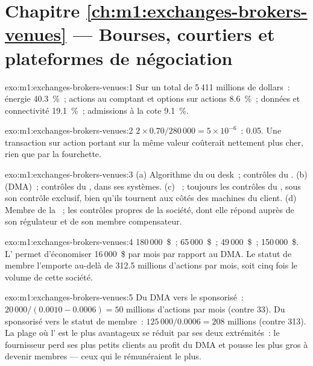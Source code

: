 \section*{Chapitre \ref{ch:m1:exchanges-brokers-venues} --- Bourses, courtiers et plateformes de négociation}

\begin{solution}{exo:m1:exchanges-brokers-venues:1}
Sur un total de 5\,411 millions de dollars~: énergie 40.3~\%~; actions au comptant et options sur actions 8.6~\%~;
données et connectivité 19.1~\%~; admissions à la cote 9.1~\%.
\end{solution}

\begin{solution}{exo:m1:exchanges-brokers-venues:2}
$2 \times 0.70/280\,000 = 5\times10^{-6}$~: \qty{0.05}{\bp}. Une transaction sur action
portant sur la même valeur coûterait nettement plus cher, rien que par la fourchette.
\end{solution}

\begin{solution}{exo:m1:exchanges-brokers-venues:3}
(a) Algorithme du  ou desk~; contrôles du . (b)  (DMA)~; contrôles du , dans ses systèmes. (c) ~;
toujours les contrôles du , sous son contrôle exclusif, bien qu'ils tournent
aux côtés des machines du client. (d) Membre de la ~; les contrôles propres de la société, dont
elle répond auprès de son régulateur et de son membre compensateur.
\end{solution}

\begin{solution}{exo:m1:exchanges-brokers-venues:4}
180\,000~\$~; 65\,000~\$~; 49\,000~\$~; 150\,000~\$. L' permet
d'économiser 16\,000~\$ par mois par rapport au DMA. Le statut de membre l'emporte au-delà de 312.5 millions
d'actions par mois, soit cinq fois le volume de cette société.
\end{solution}

\begin{solution}{exo:m1:exchanges-brokers-venues:5}
Du DMA vers le sponsorisé~: $20\,000/(0.0010-0.0006) = 50$ millions d'actions par mois
(contre 33). Du sponsorisé vers le statut de membre~: $125\,000/0.0006 = 208$ millions (contre
313). La plage où l' est le plus avantageux se réduit par ses deux extrémités~: le
fournisseur perd ses plus petits clients au profit du DMA et pousse les plus gros à devenir
membres --- ceux qui le rémunéraient le plus.
\end{solution}

